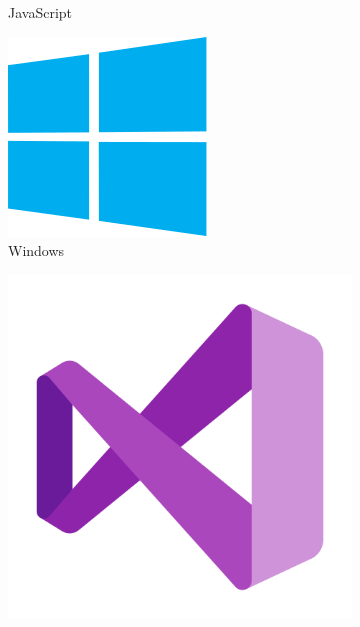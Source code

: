 \begin{figure}[!tbp]
\begin{subfigure}[b]{0.1\textwidth}
		\caption{JavaScript}
	\end{subfigure}
\newline
\begin{subfigure}[b]{0.10\textwidth}
	\includegraphics[width=\textwidth, height=\textwidth]{imagenes/software_usado/icono_windows.png}
	\caption{Windows}
\end{subfigure}
\hfill
\begin{subfigure}[b]{0.1\textwidth}
	\includegraphics[width=\textwidth, height=\textwidth]{imagenes/software_usado/icono_visual_studio.png}

\end{subfigure}
\end{figure}
